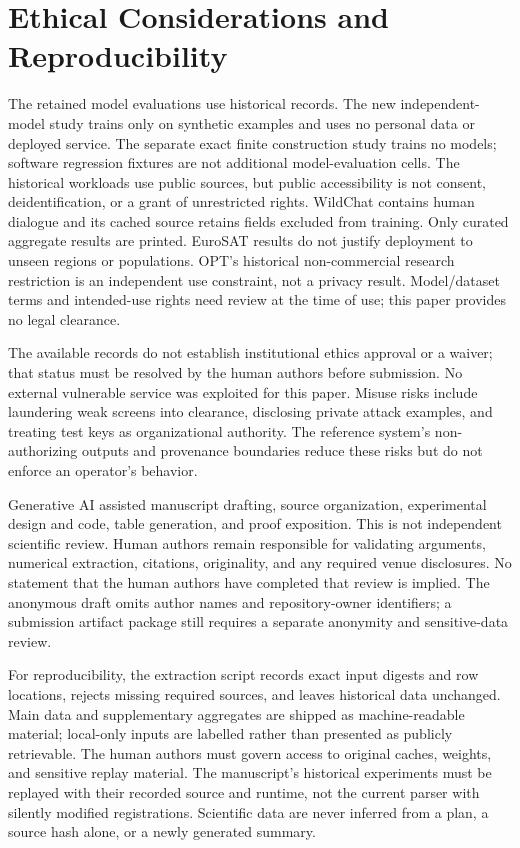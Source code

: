 \documentclass[conference,compsoc]{IEEEtran}
\begin{document}
\section{Ethical Considerations and Reproducibility}
The retained model evaluations use historical records. The new independent-model
study trains only on synthetic examples and uses no personal data or deployed
service. The separate exact finite construction study trains no models;
software regression fixtures are not additional model-evaluation cells.
The historical workloads use public sources, but public accessibility
is not consent, deidentification, or a grant of unrestricted rights. WildChat
contains human dialogue and its cached source retains fields excluded from
training. Only curated aggregate results are printed. EuroSAT results do not
justify deployment to unseen regions or populations. OPT's historical
non-commercial research restriction is an independent use constraint, not a
privacy result. Model/dataset terms and intended-use rights need review at the
time of use; this paper provides no legal clearance.

The available records do not establish institutional ethics approval or a
waiver; that status must be resolved by the human authors before submission.
No external vulnerable service was exploited for this paper. Misuse risks
include laundering weak screens into clearance, disclosing private attack
examples, and treating test keys as organizational authority. The reference
system's non-authorizing outputs and provenance boundaries reduce these risks
but do not enforce an operator's behavior.

Generative AI assisted manuscript drafting, source organization, experimental
design and code, table generation, and proof exposition. This is not independent scientific review. Human
authors remain responsible for validating arguments, numerical extraction,
citations, originality, and any required venue disclosures. No statement that
the human authors have completed that review is implied. The anonymous draft
omits author names and repository-owner identifiers; a submission artifact
package still requires a separate anonymity and sensitive-data review.

For reproducibility, the extraction script records exact input digests and
row locations, rejects missing required sources, and leaves historical data
unchanged. Main data and supplementary aggregates are shipped as machine-readable
material; local-only inputs are labelled rather than presented as publicly
retrievable. The human authors must govern access to original caches, weights,
and sensitive replay material. The manuscript's historical experiments must be
replayed with their recorded source and runtime, not the current parser with
silently modified registrations. Scientific data are never inferred from a
plan, a source hash alone, or a newly generated summary.
\end{document}
